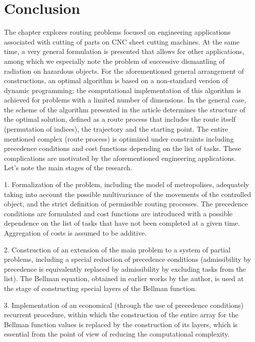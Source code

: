 \documentclass[numbers,sort&compress]{IntechOpen-Book}%
\begin{document}
\section{Conclusion}
\label{sec:6}
The chapter explores routing problems focused on engineering applications associated with cutting of parts on CNC sheet cutting machines. At the same time, a very general formulation is presented that allows for other applications, among which we especially note the problem of successive dismantling of radiation on hazardous objects. For the aforementioned general arrangement of constructions, an optimal algorithm is based on a non-standard version of dynamic programming; the computational implementation of this algorithm is achieved for problems with a limited number of dimensions. In the general case, the scheme of the algorithm presented in the article determines the structure of the optimal solution, defined as a route process that includes the route itself (permutation of indices), the trajectory and the starting point. The entire mentioned complex (route process) is optimized under constraints including precedence conditions and cost functions depending on the list of tasks. These complications are motivated by the aforementioned engineering applications. Let's note the main stages of the research.

1. Formalization of the problem, including the model of metropolises, adequately taking into account the possible multivariance of the movements of the controlled object, and the strict definition of permissible routing processes. The precedence conditions are formulated and cost functions are introduced with a possible dependence on the list of tasks that have not been completed at a given time. Aggregation of costs is assumed to be additive.

2. Construction of an extension of the main problem to a system of partial problems, including a special reduction of precedence conditions (admissibility by precedence is equivalently replaced by admissibility by excluding tasks from the list). The Bellman equation, obtained in earlier works by the author, is used at the stage of constructing special layers of the Bellman function.

3. Implementation of an economical (through the use of precedence conditions) recurrent procedure, within which the construction of the entire array for the Bellman function values is replaced by the construction of its layers, which is essential from the point of view of reducing the computational complexity.
\end{document}
